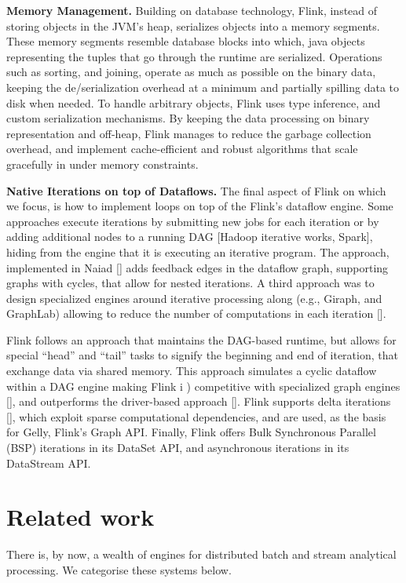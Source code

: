 \documentclass{sig-alternate}
\begin{document}
\textbf{Memory Management.} Building on database technology, Flink, instead of storing objects in the JVM's heap, serializes objects into a  memory segments. These memory segments resemble database blocks into which, java objects representing the tuples that go through the runtime are serialized. Operations such as sorting, and joining, operate as much as possible on the binary data, keeping the de/serialization overhead at a minimum and partially spilling data to disk when needed. To handle arbitrary objects, Flink uses type inference, and  custom serialization mechanisms.  By keeping the data processing on binary representation and off-heap, Flink manages to reduce the garbage collection overhead, and implement cache-efficient and robust algorithms that scale gracefully in under memory constraints.

\textbf{Native Iterations on top of Dataflows.} The final aspect of Flink on which we focus, is how to implement loops on top of the Flink's dataflow engine. Some approaches execute iterations by submitting new jobs for each iteration or by adding additional nodes to a running DAG [Hadoop iterative works, Spark], hiding from  the engine that it is executing an iterative program. The approach, implemented in Naiad [] adds feedback edges in the dataflow graph, supporting graphs with cycles, that  allow for nested iterations. A third approach was to design specialized engines around iterative processing along (e.g., Giraph, and GraphLab) allowing to reduce the number of computations in each iteration [].

Flink follows an approach that maintains the DAG-based runtime, but allows for special ``head'' and ``tail'' tasks to signify the beginning and end of iteration, that exchange data via shared memory. This approach simulates a cyclic dataflow within a DAG engine making Flink i ) competitive with specialized graph engines [], and outperforms the driver-based approach []. Flink supports delta iterations [], which exploit sparse computational dependencies, and are used, as the basis for Gelly, Flink's Graph API. Finally, Flink offers Bulk Synchronous Parallel (BSP) iterations in its DataSet API, and asynchronous iterations in its DataStream API.


\section{Related work}

There is, by now, a wealth of engines for distributed batch and stream analytical processing. We categorise these systems below. 
\end{document}
